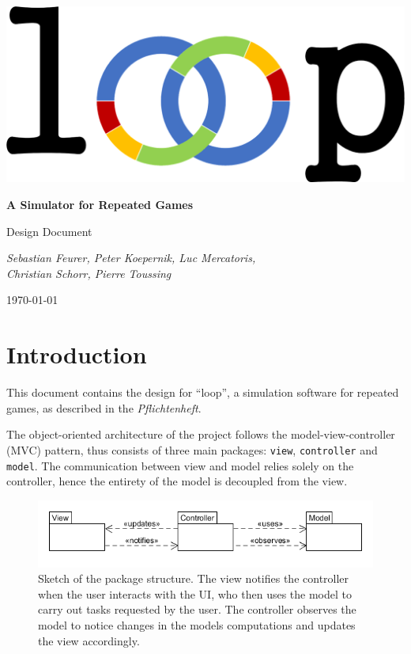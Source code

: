 \documentclass[parskip=full,11pt]{scrartcl}
\begin{document}
\begin{titlepage}
	\centering
	\vspace*{5cm}
	\includegraphics[width = 0.7\linewidth]{images/Logos/loop.png}\par
	{\huge\bfseries A Simulator for Repeated Games\par}
	{\Large Design Document\par}
	\vspace{2cm}
	{\Large\itshape Sebastian Feurer, Peter Koepernik, Luc Mercatoris,\\Christian Schorr, Pierre Toussing\par}
	\vfill
	{\large \today\par}
\end{titlepage}

\tableofcontents
\pagebreak

\section{Introduction}
This document contains the design for \enquote{loop}, a simulation software for repeated games, as described in the \textit{Pflichtenheft}.

The object-oriented architecture of the project follows the model-view-controller (MVC) pattern, thus consists of three main packages: \texttt{view}, \texttt{controller} and \texttt{model}. The communication between view and model relies solely on the controller, hence the entirety of the model is decoupled from the view.

\begin{figure}[h]
	\centering
	\includegraphics[width=0.7\linewidth]{images/package_diagram_overview.png}
	\caption{Sketch of the package structure. The view notifies the controller when the user interacts with the UI, who then uses the model to carry out tasks requested by the user. The controller observes the model to notice changes in the models computations and updates the view accordingly.}
	\label{package_overview}
\end{figure}
\end{document}

